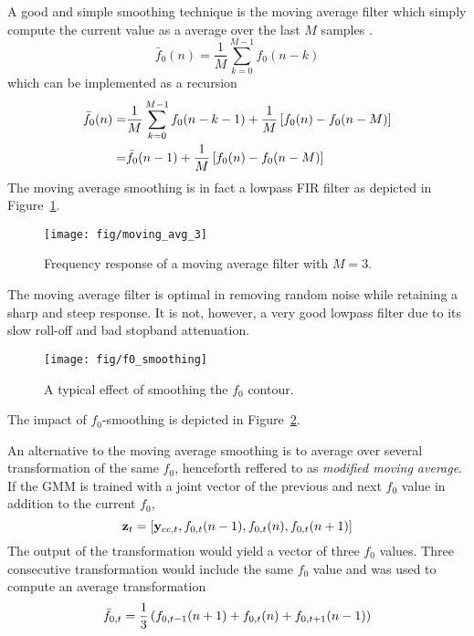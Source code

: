 A good and simple smoothing technique is the moving average filter which simply compute the current value as a average over the last $M$ samples \cite{digsig}.
\begin{equation}
		\bar{f}_0(n) = \frac{1}{M}\sum_{k=0}^{M-1}f_0(n-k)
\end{equation}
which can be implemented as a recursion
\begin{equation}
	\begin{split}
		\bar{f}_0(n) = & \frac{1}{M} \sum_{k=0}^{M-1}f_0(n-k-1) + \frac{1}{M} \left[f_0(n)-f_0(n-M)\right] \\
		= & \bar{f}_0(n-1) + \frac{1}{M} \left[f_0(n)-f_0(n-M)\right] \\
	\end{split}
\end{equation}
The moving average smoothing is in fact a lowpass FIR filter as depicted in Figure~\ref{fig:moving_avg}.
\begin{figure}[htbp]
	\begin{center}
		\texttt{[image: fig/moving\_avg\_3]}
		\caption{Frequency response of a moving average filter with $M=3$.}
		\label{fig:moving_avg}
	\end{center}
\end{figure}
The moving average filter is optimal in removing random noise while retaining a sharp and steep response. It is not, however, a very good lowpass filter due to its slow roll-off and bad stopband attenuation.
\begin{figure}[htbp]
	\begin{center}
		\texttt{[image: fig/f0\_smoothing]}
		\caption{A typical effect of smoothing the $f_0$ contour.}
		\label{fig:f0_smoothing}
	\end{center}
\end{figure}
The impact of $f_0$-smoothing is depicted in Figure~\ref{fig:f0_smoothing}.

An alternative to the moving average smoothing is to average over several transformation of the same $f_0$, henceforth reffered to as \emph{modified moving average}. If the GMM is trained with a joint vector of the previous and next $f_0$ value in addition to the current $f_0$,
\begin{equation}
	\mathbf{z}_t = \left[\mathbf{y}_{cc,t}, f_{0,t}(n-1), f_{0,t}(n), f_{0,t}(n+1)\right] 
\end{equation}
The output of the transformation would yield a vector of three $f_0$ values. Three consecutive transformation would include the same $f_0$ value and was used to compute an average transformation
\begin{equation}
	\bar{f}_{0,t} = \frac{1}{3}\left(f_{0,t-1}(n+1)+f_{0,t}(n)+f_{0,t+1}(n-1)\right) 
\end{equation}

